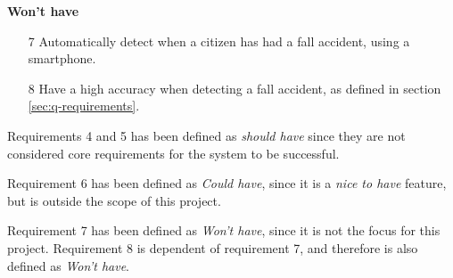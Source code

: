 \textbf{Won't have}
\begin{itemize}
    \item[7] Automatically detect when a citizen has had a fall accident, using a smartphone.
    \item[8] Have a high accuracy when detecting a fall accident, as defined in section \ref{sec:q-requirements}.
\end{itemize}


Requirements 4 and 5 has been defined as \textit{should have} since they are not considered core requirements for the system to be successful.

Requirement 6 has been defined as \textit{Could have}, since it is a \textit{nice to have} feature, but is outside the scope of this project.

Requirement 7 has been defined as \textit{Won't have}, since it is not the focus for this project. Requirement 8 is dependent of requirement 7, and therefore is also defined as \textit{Won't have}.